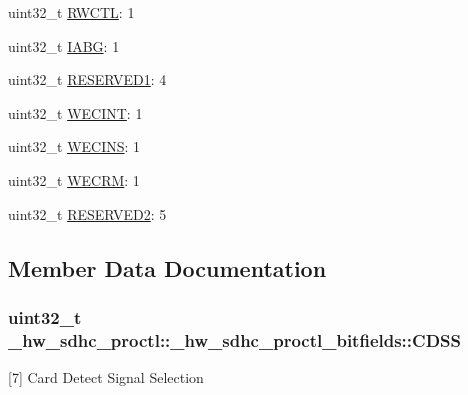 \begin{DoxyCompactItemize}
\item 
uint32\+\_\+t \hyperlink{struct__hw__sdhc__proctl_1_1__hw__sdhc__proctl__bitfields_a55ed296293769a41ce03b0f73875a4fa}{R\+W\+C\+TL}\+: 1
\item 
uint32\+\_\+t \hyperlink{struct__hw__sdhc__proctl_1_1__hw__sdhc__proctl__bitfields_add78a47eea96b04c23bdaf27d778c0b3}{I\+A\+BG}\+: 1
\item 
uint32\+\_\+t \hyperlink{struct__hw__sdhc__proctl_1_1__hw__sdhc__proctl__bitfields_a09209eeb5ab3209c2914fbbe3238d51e}{R\+E\+S\+E\+R\+V\+E\+D1}\+: 4
\item 
uint32\+\_\+t \hyperlink{struct__hw__sdhc__proctl_1_1__hw__sdhc__proctl__bitfields_a1d43aabb771ff15057354c64fc49a31f}{W\+E\+C\+I\+NT}\+: 1
\item 
uint32\+\_\+t \hyperlink{struct__hw__sdhc__proctl_1_1__hw__sdhc__proctl__bitfields_adfe2e82324607b89002df1ffa5ee7dc9}{W\+E\+C\+I\+NS}\+: 1
\item 
uint32\+\_\+t \hyperlink{struct__hw__sdhc__proctl_1_1__hw__sdhc__proctl__bitfields_aeb4e4061b8679bd03f32dbfc82595102}{W\+E\+C\+RM}\+: 1
\item 
uint32\+\_\+t \hyperlink{struct__hw__sdhc__proctl_1_1__hw__sdhc__proctl__bitfields_a11c34509cbdc4a204fac7f6a649c1feb}{R\+E\+S\+E\+R\+V\+E\+D2}\+: 5
\end{DoxyCompactItemize}


\subsection{Member Data Documentation}
\subsubsection[{\texorpdfstring{C\+D\+SS}{CDSS}}]{\setlength{\rightskip}{0pt plus 5cm}uint32\+\_\+t \+\_\+hw\+\_\+sdhc\+\_\+proctl\+::\+\_\+hw\+\_\+sdhc\+\_\+proctl\+\_\+bitfields\+::\+C\+D\+SS}\hypertarget{struct__hw__sdhc__proctl_1_1__hw__sdhc__proctl__bitfields_a2b8fd3f5f7fd223b514ecedff4283cad}{}\label{struct__hw__sdhc__proctl_1_1__hw__sdhc__proctl__bitfields_a2b8fd3f5f7fd223b514ecedff4283cad}
\mbox{[}7\mbox{]} Card Detect Signal Selection 
